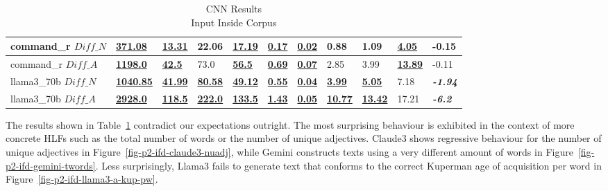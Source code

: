 \documentclass[11pt]{article}
\begin{document}
\begin{table}[ht]
{\begin{tabular}{lllllllllll}
            command\_r $Diff\_N$  & \textbf{\underline{371.08}}  & \textbf{\underline{13.31}}  & 22.06                       & \textbf{\underline{17.19}} & \textbf{\underline{0.17}} & \textbf{\underline{0.02}} & 0.88                       & 1.09                       & \textbf{\underline{4.05}}  & -0.15                   \\ \midrule
            command\_r $Diff\_A$  & \textbf{\underline{1198.0}}  & \textbf{\underline{42.5}}   & 73.0                        & \textbf{\underline{56.5}}  & \textbf{\underline{0.69}} & \textbf{\underline{0.07}} & 2.85                       & 3.99                       & \textbf{\underline{13.89}} & -0.11                   \\ \midrule
            llama3\_70b $Diff\_N$ & \textbf{\underline{1040.85}} & \textbf{\underline{41.99}}  & \textbf{\underline{80.58}}  & \textbf{\underline{49.12}} & \textbf{\underline{0.55}} & \textbf{\underline{0.04}} & \textbf{\underline{3.99}}  & \textbf{\underline{5.05}}  & 7.18                       & \textbf{\textit{-1.94}} \\ \midrule
            llama3\_70b $Diff\_A$ & \textbf{\underline{2928.0}}  & \textbf{\underline{118.5}}  & \textbf{\underline{222.0}}  & \textbf{\underline{133.5}} & \textbf{\underline{1.43}} & \textbf{\underline{0.05}} & \textbf{\underline{10.77}} & \textbf{\underline{13.42}} & 17.21                      & \textbf{\textit{-6.2}}  \\ \bottomrule
        \end{tabular}%
    }
    \caption{CNN Results\\Input Inside Corpus}
    \label{table-prompt-2-ifd-cnn-dailymail}
\end{table}

The results shown in Table~\ref{table-prompt-2-ifd-cnn-dailymail} contradict our
expectations outright.
The most surprising behaviour is exhibited in the context of more concrete HLFs
such as the total number of words or the number of unique adjectives.
Claude3 shows regressive behaviour for the number of unique adjectives in
Figure~\ref{fig-p2-ifd-claude3-nuadj}, while Gemini constructs texts using a
very different amount of words in Figure~\ref{fig-p2-ifd-gemini-twords}.
Less surprisingly, Llama3 fails to generate text that conforms to the correct
Kuperman age of acquisition per word in Figure~\ref{fig-p2-ifd-llama3-a-kup-pw}.
\end{document}
